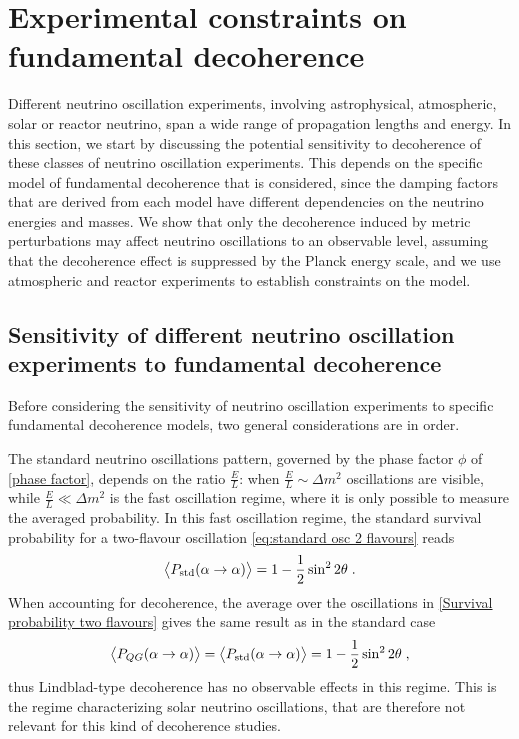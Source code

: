 \documentclass[11pt]{article}
\begin{document}
\section{Experimental constraints on fundamental decoherence}\label{sec:experiments}

Different neutrino oscillation experiments, involving astrophysical, atmospheric, solar or reactor neutrino, span  a wide range of propagation lengths and  energy. 
In this section, we start by discussing the potential sensitivity to decoherence  of these classes of neutrino oscillation experiments. This depends on the specific model of fundamental decoherence that is considered, since the damping factors that are derived from each model have different dependencies on the neutrino energies and masses.
We show that only the decoherence induced by metric perturbations \cite{Breuer:2008rh} may affect neutrino oscillations to an observable level, assuming that the decoherence effect is suppressed by the Planck energy scale, and we use atmospheric and reactor experiments to establish constraints on the model.



\subsection{Sensitivity of different neutrino oscillation experiments to fundamental decoherence}

Before considering the sensitivity of neutrino oscillation experiments to specific fundamental decoherence models, two general considerations are in order.

The standard neutrino oscillations pattern, governed by the phase factor $\phi$ of \eqref{phase factor}, depends on the ratio $\frac{E}{L}$:  when $\frac{E}{L}\sim \Delta m^2$ oscillations are visible, while $\frac{E}{L}\ll \Delta m^2$ is the fast oscillation regime, where it is only possible to measure the averaged probability. In this fast oscillation regime, the standard survival probability for a two-flavour oscillation \eqref{eq:standard osc 2 flavours} reads  
\begin{equation}
    \expval{P_{\text{std}}(\alpha\to\alpha)} = 1-\frac{1}{2}\sin^2 2\theta\;.
\end{equation}
When accounting for decoherence, the average over the oscillations in \eqref{Survival probability two flavours} gives the same result as in the standard case
\begin{equation}\label{Average survival probability}
    \expval{ P_{QG}(\alpha\to\alpha)} = \expval{P_{\text{std}}(\alpha\to\alpha)} = 1-\frac{1}{2}\sin^2 2\theta\;,
\end{equation}
thus Lindblad-type decoherence  has no observable effects in this regime.
This is the regime characterizing  solar neutrino oscillations, that are therefore not relevant for this kind of decoherence studies.
\end{document}
